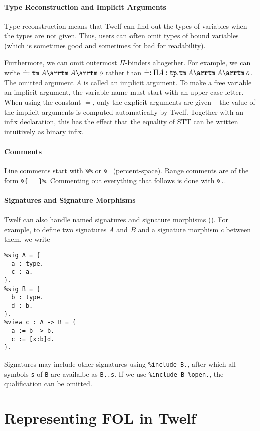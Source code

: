\paragraph{Type Reconstruction and Implicit Arguments}
Type reconstruction means that Twelf can find out the types of variables when the types are not given. Thus, users can often omit types of bound variables (which is sometimes good and sometimes for bad for readability).

Furthermore, we can omit outermost $\Pi$-binders altogether. For example, we can write $\doteq:\Term\;A\arr\Term\;A\arr\Term\;o$ rather than $\doteq:\P{A}{\Type}\Term\;A\arr\Term\;A\arr\Term\;o$. The omitted argument $A$ is called an implicit argument. To make a free variable an implicit argument, the variable name must start with an upper case letter. When using the constant $\doteq$, only the explicit arguments are given -- the value of the implicit arguments is computed automatically by Twelf. Together with an infix declaration, this has the effect that the equality of STT can be written intuitively as binary infix.

\paragraph{Comments}
Line comments start with \verb|%%| or \verb|% | (percent-space). Range comments are of the form \verb|%{   }%|. Commenting out everything that follows is done with \verb|%.|.

\paragraph{Signatures and Signature Morphisms}
Twelf can also handle named signatures and signature morphisms (\cite{RS:twelfmod:09}). For example, to define two signatures $A$ and $B$ and a signature morphism $c$ between them, we write
\begin{lstlisting}
%sig A = {
  a : type.
  c : a.
}.
%sig B = {
  b : type.
  d : b.
}.
%view c : A -> B = {
  a := b -> b.
  c := [x:b]d.
}.
\end{lstlisting}

Signatures may include other signatures using \verb|%include B.|, after which all symbols \verb|s| of \verb|B| are availalbe as \verb|B..s|. If we use \verb|%include B %open.|, the qualification can be omitted.

\section{Representing FOL in Twelf}

